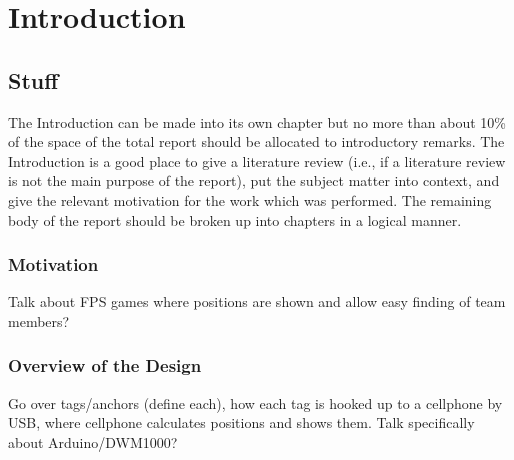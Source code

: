 
\chapter{Introduction} %

\label{Introduction} %


\section{Stuff}
The Introduction
can be made into its own chapter but no more than about 10\% of the space of the total report
should be allocated to introductory remarks. The Introduction is a good place to give a literature
review (i.e., if a literature review is not the main purpose of the report), put the subject matter into
context, and give the relevant motivation for the work which was performed. The remaining body
of the report should be broken up into chapters in a logical manner.

\subsection{Motivation}
Talk about FPS games where positions are shown and allow easy finding of team members? 

\subsection{Overview of the Design}
Go over tags/anchors (define each), how each tag is hooked up to a cellphone by USB, where cellphone calculates positions and shows them. Talk specifically about Arduino/DWM1000?